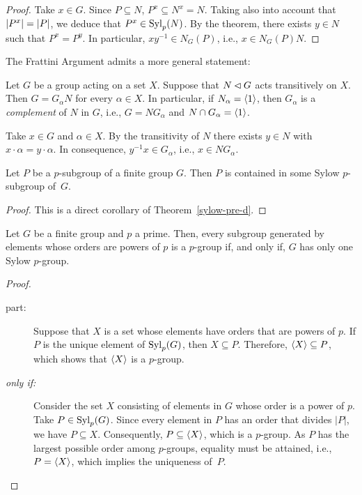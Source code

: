 \begin{proof} Take $x\in G$. Since $P\subseteq N$, $P^x\subseteq N^x=N$. Taking also into account that $\left\vert{P^x}\right\vert=\left\vert{P}\right\vert$, we deduce that $P^x\in{\rm Syl}_p(N)$. By the theorem, there exists $y\in N$ such that $P^x=P^y$. In particular, $xy^{-1}\in N_G(P)$, i.e., $x\in N_G(P)N$.  \end{proof}

\begin{rem}\label{frattini-argument-2}
    The\/ \textrm{\upshape Frattini Argument} admits a more general statement:

    Let\/ $G$ be a group acting on a set\/ $X$. Suppose that\/ $N\lhd G$ acts transitively on\/ $X$. Then\/ $G = G_\alpha N$ for every\/ $\alpha\in X$. In particular, if\/ $N_\alpha = \langle1\rangle$, then\/ $G_\alpha$ is a \textsl{complement} of\/ $N$ in\/ $G$, i.e., $G=NG_\alpha$ and\/ $N\cap G_\alpha=\langle1\rangle$.

    \textrm{\small\upshape Take $x\in G$ and $\alpha\in X$. By the transitivity of $N$ there exists $y\in N$ with $x\cdot\alpha=y\cdot\alpha$. In consequence, $y^{-1}x\in G_\alpha$, i.e., $x\in NG_\alpha$.}
\end{rem}

\begin{thm}\label{sylow-d} {\upshape[Sylow-D]}
    Let $P$ be a $p$-subgroup of a finite group $G$. Then $P$ is contained in some Sylow $p$-subgroup of\/~$G$.
\end{thm}

\begin{proof} This is a direct corollary of Theorem~\ref{sylow-pre-d}.  \end{proof}

\begin{cor}
    Let\/ $G$ be a finite group and\/ $p$ a prime. Then, every subgroup generated by elements whose orders are powers of\/ $p$ is a $p$-group if, and only if, $G$ has only one Sylow $p$-group.
\end{cor}
\begin{proof}
\begin{description}
    \item[\textrm{ part:}] Suppose that $X$ is a set whose elements have orders that are powers of $p$. If $P$ is the unique element of ${\rm Syl}_p(G)$, then $X\subseteq P$. Therefore, $\langle X\rangle\subseteq P$, which shows that $\langle X\rangle$ is a $p$-group. 
    \item[\it only if\/\upshape:] Consider the set $X$ consisting of elements in $G$ whose order is a power of $p$. Take $P\in{\rm Syl}_p(G)$. Since every element in $P$ has an order that divides $|P|$, we have $P \subseteq X$. Consequently, $P \subseteq \langle X\rangle$, which is a $p$-group. As $P$ has the largest possible order among $p$-groups, equality must be attained, i.e., $P=\langle X\rangle$, which implies the uniqueness of~$P$.
\end{description}
\end{proof}


